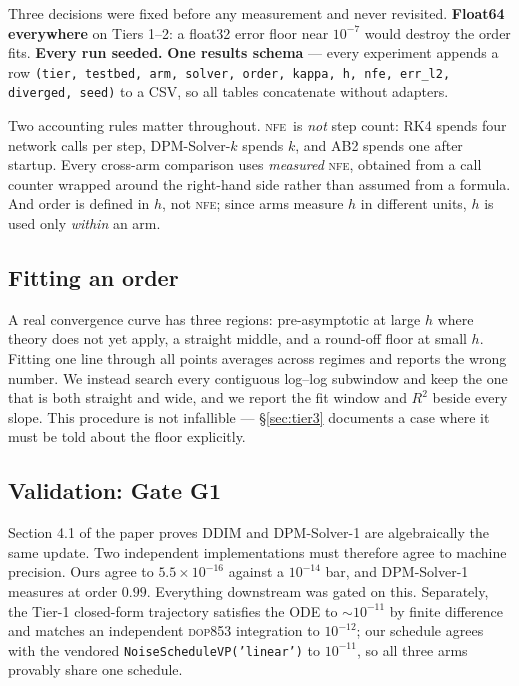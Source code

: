 \documentclass[11pt,a4paper]{article}
\newcommand{\NFE}{\textsc{nfe}}
\begin{document}
Three decisions were fixed before any measurement and never revisited.
\textbf{Float64 everywhere} on Tiers 1--2: a float32 error floor near $10^{-7}$
would destroy the order fits. \textbf{Every run seeded.} \textbf{One results
schema} --- every experiment appends a row
\texttt{(tier, testbed, arm, solver, order, kappa, h, nfe, err\_l2, diverged,
seed)} to a CSV, so all tables concatenate without adapters.

Two accounting rules matter throughout. \NFE\ is \emph{not} step count: RK4
spends four network calls per step, DPM-Solver-$k$ spends $k$, and AB2 spends one
after startup. Every cross-arm comparison uses \emph{measured} \NFE, obtained
from a call counter wrapped around the right-hand side rather than assumed from a
formula. And order is defined in $h$, not \NFE; since arms measure $h$ in
different units, $h$ is used only \emph{within} an arm.

\subsection{Fitting an order}

A real convergence curve has three regions: pre-asymptotic at large $h$ where
theory does not yet apply, a straight middle, and a round-off floor at small $h$.
Fitting one line through all points averages across regimes and reports the wrong
number. We instead search every contiguous log--log subwindow and keep the one
that is both straight and wide, and we report the fit window and $R^2$ beside
every slope. This procedure is not infallible --- \S\ref{sec:tier3} documents a
case where it must be told about the floor explicitly.

\subsection{Validation: Gate G1}

Section 4.1 of the paper proves DDIM and DPM-Solver-1 are algebraically the same
update. Two independent implementations must therefore agree to machine
precision. Ours agree to $5.5\times10^{-16}$ against a $10^{-14}$ bar, and
DPM-Solver-1 measures at order $0.99$. Everything downstream was gated on this.
Separately, the Tier-1 closed-form trajectory satisfies the ODE to $\sim10^{-11}$
by finite difference and matches an independent \textsc{dop853} integration to
$10^{-12}$; our schedule agrees with the vendored
\texttt{NoiseScheduleVP('linear')} to $10^{-11}$, so all three arms provably
share one schedule.
\end{document}
